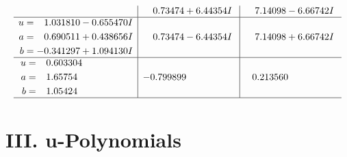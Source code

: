 \documentclass[1p]{elsarticle_modified}
\theoremstyle{definition}
\begin{document}
$$\begin{array}{c|c|c}
 & \phantom{-}0.73474 + 6.44354 I & \phantom{-}7.14098 - 6.66742 I \\ \hline\begin{aligned}
u &= \phantom{-}1.031810 - 0.655470 I \\
a &= \phantom{-}0.690511 + 0.438656 I \\
b &= -0.341297 + 1.094130 I\end{aligned}
 & \phantom{-}0.73474 - 6.44354 I & \phantom{-}7.14098 + 6.66742 I \\ \hline\begin{aligned}
u &= \phantom{-}0.603304\phantom{ +0.000000I} \\
a &= \phantom{-}1.65754\phantom{ +0.000000I} \\
b &= \phantom{-}1.05424\phantom{ +0.000000I}\end{aligned}
 & -0.799899\phantom{ +0.000000I} & \phantom{-}0.213560\phantom{ +0.000000I}\\
 \hline 
 \end{array}$$\newpage
\newpage\renewcommand{\arraystretch}{1}
\centering \section*{ III. u-Polynomials}
\end{document}

